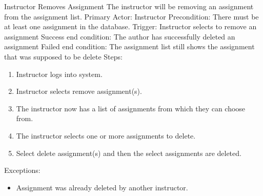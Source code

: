     \begin{section}{Instructor Removes Assignment}
		The instructor will be removing an assignment from the assignment list. \newline
		Primary Actor: Instructor \newline
		Precondition: There must be at least one assignment in the database. \newline
		Trigger: Instructor selects to remove an assignment \newline
		Success end condition: The author has successfully deleted an assignment \newline
		Failed end condition: The assignment list still shows the assignment that was supposed to be delete \newline
		\newline
        Steps:
        \begin{enumerate}
            \item{Instructor logs into system.}
            \item{Instructor selects remove assignment(s).}
            \item{The instructor now has a list of assignments from which they can choose from.}
            \item{The instructor selects one or more assignments to delete.}
			\item{Select delete assignment(s) and then the select assignments are deleted.}
        \end{enumerate}
        Exceptions:
        \begin{itemize}
            \item{Assignment was already deleted by another instructor.}
        \end{itemize}
    \end{section}		
	
